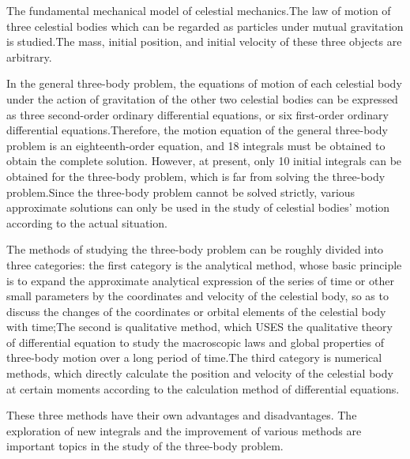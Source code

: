 \documentclass{dmuthesis}
\begin{document}
\begin{abstracten}
\thispagestyle{empty} %

The fundamental mechanical model of celestial mechanics.The law of motion of three celestial bodies which can be regarded as particles under mutual gravitation is studied.The mass, initial position, and initial velocity of these three objects are arbitrary.

In the general three-body problem, the equations of motion of each celestial body under the action of gravitation of the other two celestial bodies can be expressed as three second-order ordinary differential equations, or six first-order ordinary differential equations.Therefore, the motion equation of the general three-body problem is an eighteenth-order equation, and 18 integrals must be obtained to obtain the complete solution.
However, at present, only 10 initial integrals can be obtained for the three-body problem, which is far from solving the three-body problem.Since the three-body problem cannot be solved strictly, various approximate solutions can only be used in the study of celestial bodies' motion according to the actual situation.

The methods of studying the three-body problem can be roughly divided into three categories: the first category is the analytical method, whose basic principle is to expand the approximate analytical expression of the series of time or other small parameters by the coordinates and velocity of the celestial body, so as to discuss the changes of the coordinates or orbital elements of the celestial body with time;The second is qualitative method, which USES the qualitative theory of differential equation to study the macroscopic laws and global properties of three-body motion over a long period of time.The third category is numerical methods, which directly calculate the position and velocity of the celestial body at certain moments according to the calculation method of differential equations.

These three methods have their own advantages and disadvantages. The exploration of new integrals and the improvement of various methods are important topics in the study of the three-body problem.

\end{abstracten}

\tableofcontents
\thispagestyle{empty} %
\end{document}
